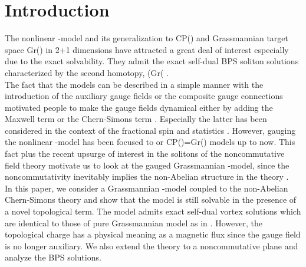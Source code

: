 \documentclass[a4paper,12pt]{article}
\def\Z{{\mathop{\hbox{\msym\char '132}}}}
\begin{document}
\section{Introduction}
The \coordHE{} nonlinear \myHighlight{$\sigma$}\coordHE{}-model \cite{bela} and its generalization to CP(\coordHE{}) and  Grassmannian target space
Gr(\coordHE{})\coordHE{} in 2+1 dimensions \cite{zakr} have attracted a great deal of
interest \cite{haldane} especially due to the exact solvability. They admit the exact self-dual BPS soliton
solutions characterized by the second homotopy, \coordHE{}(Gr(\myHighlight{$N,M))=\Z$}\coordHE{} \cite{pere}.\\

The fact that the models can be described in a simple manner with the introduction of the auxiliary gauge fields or the composite gauge connections
motivated people to make the gauge fields dynamical either by adding the Maxwell term or the Chern-Simons term \cite{nard,rajeev}.  Especially the
latter has been considered in the context of the fractional spin and statistics \cite{wilz1}. However, gauging the nonlinear \myHighlight{$\sigma$}\coordHE{}-model has been
 focused to \coordHE{} or CP(\coordHE{})=Gr(\coordHE{}) models up to now. This fact plus the recent upsurge of interest in the solitons of the noncommutative
field theory \cite{harv} motivate us to look at the gauged Grassmannian \myHighlight{$\sigma$}\coordHE{}-model, since the noncommutativity inevitably implies
 the non-Abelian structure in the theory \cite{bak}.\\

In this paper, we consider a Grassmannian \myHighlight{$\sigma$}\coordHE{}-model coupled to the non-Abelian Chern-Simons theory \cite{jack} and show
that  the model is still solvable in the presence of a novel topological term. The model admits exact self-dual
vortex solutions which are identical to those of pure Grassmannian model as in \cite{zakr,macf}. However, the
topological charge has a physical meaning as a magnetic flux since the gauge field is no longer auxiliary. We also
extend the theory to a noncommutative plane and analyze the BPS solutions.\\
\end{document}
